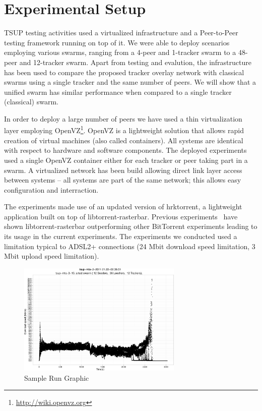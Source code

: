 \section{Experimental Setup}
\label{sec:unified-tracker:setup}

TSUP testing activities used a virtualized infrastructure and a
Peer-to-Peer testing framework running on top of it. We were able to deploy
scenarios employing various swarms, ranging from a 4-peer and 1-tracker swarm
to a 48-peer and 12-tracker swarm. Apart from testing and evalution, the
infrastructure has been used to compare the proposed tracker overlay network
with classical swarms using a single tracker and the same number of peers. We
will show that a unified swarm has similar performance when compared to a
single tracker (classical) swarm.

In order to deploy a large number of peers we have used a thin virtualization
layer employing OpenVZ\footnote{\url{http://wiki.openvz.org}}. OpenVZ is a
lightweight solution that allows rapid creation of virtual machines (also
called containers). All systems are identical with respect to hardware and
software components. The deployed experiments used a single OpenVZ container
either for each tracker or peer taking part in a swarm. A virtualized network
has been build allowing direct link layer access between systems -- all
systems are part of the same network; this allows easy configuration and
interraction.

The experiments made use of an updated version of hrktorrent, a lightweight
application built on top of libtorrent-rasterbar. Previous
experiments~\cite{bt-vi} have shown libtorrent-rasterbar outperforming other
BitTorrent experiments leading to its usage in the current experiments. The
experiments we conducted used a limitation typical to ADSL2+ connections (24
Mbit download speed limitation, 3 Mbit upload speed limitation).

\begin{figure}[h]
  \begin{center}
    \includegraphics[width=0.7\textwidth]{src/img/unified-tracker/tsup-sample-run-48peers}
  \end{center}
  \caption{Sample Run Graphic}
  \label{fig:unified-tracker:tsup-sample-run}
\end{figure}

